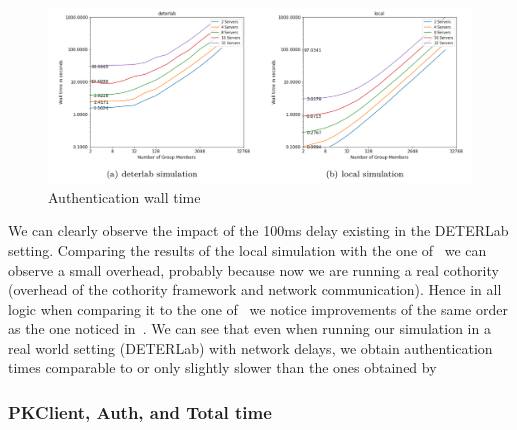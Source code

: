     \begin{figure}
        \centering
        \includegraphics[width=0.8\linewidth]{images/plots/authenticationtimeHack.png}
        \vspace*{1cm}
        \caption{Authentication wall time}
        \label{fig:authtime}
    \end{figure}
    We can clearly observe the impact of the 100ms delay existing in the DETERLab setting.
    Comparing the results of the local simulation with the one of~\cite{villard_report_pfs_pop.pdf_2017} we can observe
    a small overhead, probably because now we are running a real cothority (overhead of the cothority framework and network communication).
    Hence in all logic when comparing it to the one of~\cite{syta_identity_2015} we notice improvements of the same order
    as the one noticed in~\cite{villard_report_pfs_pop.pdf_2017}.
    We can see that even when running our simulation in a real world setting (DETERLab) with network delays, we obtain
    authentication times comparable to or only slightly slower than the ones obtained by~\cite{syta_identity_2015}

    \subsubsection{PKClient, Auth, and Total time}


